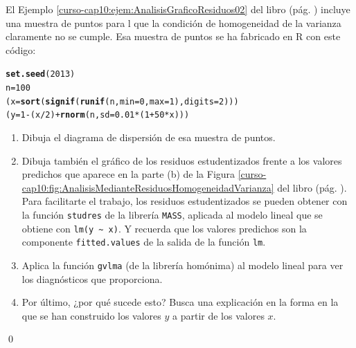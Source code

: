 \documentclass[10pt,a4paper]{article}\usepackage[]{graphicx}\usepackage[]{color}
\makeatletter
\newcommand{\hlnum}[1]{\textcolor[rgb]{0.686,0.059,0.569}{#1}}%
\newcommand{\hlopt}[1]{\textcolor[rgb]{0,0,0}{#1}}%
\newcommand{\hlstd}[1]{\textcolor[rgb]{0.345,0.345,0.345}{#1}}%
\newcommand{\hlkwb}[1]{\textcolor[rgb]{0.69,0.353,0.396}{#1}}%
\newcommand{\hlkwc}[1]{\textcolor[rgb]{0.333,0.667,0.333}{#1}}%
\newcommand{\hlkwd}[1]{\textcolor[rgb]{0.737,0.353,0.396}{\textbf{#1}}}%
\newenvironment{kframe}{%
 \def\at@end@of@kframe{}%
 \ifinner\ifhmode%
  \def\at@end@of@kframe{\end{minipage}}%
  \begin{minipage}{\columnwidth}%
 \fi\fi%
 \def\FrameCommand##1{\hskip\@totalleftmargin \hskip-\fboxsep
 \colorbox{shadecolor}{##1}\hskip-\fboxsep
     \hskip-\linewidth \hskip-\@totalleftmargin \hskip\columnwidth}%
 \MakeFramed {\advance\hsize-\width
   \@totalleftmargin\z@ \linewidth\hsize
   \@setminipage}}%
 {\par\unskip\endMakeFramed%
 \at@end@of@kframe}
\newenvironment{knitrout}{}{} %
\makeatother
\begin{document}
\begin{ejercicio}
\label{tut10:ejercicio11}
El Ejemplo \ref{curso-cap10:ejem:AnalisisGraficoResiduos02} del libro (pág. \pageref{curso-cap10:ejem:AnalisisGraficoResiduos02}) incluye una muestra de puntos para l que la condición de homogeneidad de la varianza claramente no se cumple. Esa muestra de puntos se ha fabricado en R con este código:
\begin{knitrout}
\color{fgcolor}\begin{kframe}
\begin{alltt}
\hlkwd{set.seed}\hlstd{(}\hlnum{2013}\hlstd{)}
\hlstd{n}\hlkwb{=}\hlnum{100}
\hlstd{(x} \hlkwb{=} \hlkwd{sort}\hlstd{(}\hlkwd{signif}\hlstd{(}\hlkwd{runif}\hlstd{(n,} \hlkwc{min}\hlstd{=}\hlnum{0}\hlstd{,} \hlkwc{max}\hlstd{=}\hlnum{1} \hlstd{),} \hlkwc{digits}\hlstd{=}\hlnum{2}\hlstd{) )  )}
\hlstd{(y} \hlkwb{=} \hlnum{1} \hlopt{-} \hlstd{(x}\hlopt{/}\hlnum{2}\hlstd{)} \hlopt{+} \hlkwd{rnorm}\hlstd{(n,}\hlkwc{sd}\hlstd{=}\hlnum{0.01}\hlopt{*}\hlstd{(}\hlnum{1}\hlopt{+}\hlnum{50}\hlopt{*}\hlstd{x)))}
\end{alltt}
\end{kframe}
\end{knitrout}

\begin{enumerate}
  \item Dibuja el diagrama de dispersión de esa muestra de puntos.
  \item Dibuja también el gráfico de los residuos estudentizados frente a los valores predichos que aparece en la parte (b) de la Figura \ref{curso-cap10:fig:AnalisisMedianteResiduosHomogeneidadVarianza} del libro (pág. \pageref{curso-cap10:fig:AnalisisMedianteResiduosHomogeneidadVarianza}). Para facilitarte el trabajo, los residuos estudentizados se pueden obtener con la función {\tt studres} de la librería {\tt MASS}, aplicada al modelo lineal que se obtiene con \verb#lm(y ~ x)#. Y recuerda que los valores predichos son la componente {\tt fitted.values} de la salida de la función {\tt lm}.

  \item Aplica la función {\tt gvlma} (de la librería homónima) al modelo lineal para ver los diagnósticos que proporciona.

  \item Por último, ¿por qué sucede esto? Busca una explicación en la forma en la que se han construido los valores $y$ a partir de los valores $x$.
\end{enumerate}
\qed
\end{ejercicio}
\end{document}
